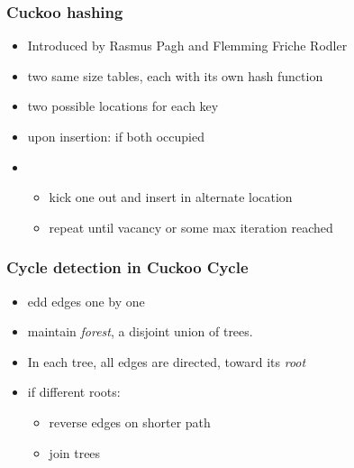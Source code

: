 \documentclass{beamer}
\begin{document}
\begin{frame}
\frametitle{Cuckoo hashing}
\begin{itemize}
\item Introduced by Rasmus Pagh and Flemming Friche Rodler
\pause
\item two same size tables, each with its own hash function
\pause
\item two possible locations for each key
\pause
\item upon insertion: if both occupied
\pause
\item
\begin{itemize}
\item kick one out and insert in alternate location
\pause
\item repeat until vacancy or some max iteration reached
\end{itemize}
\end{itemize}
\end{frame}

\begin{frame}
\frametitle{Cycle detection in Cuckoo Cycle}
\begin{itemize}
\item edd edges one by one
\pause
\item maintain {\em forest}, a disjoint union of trees.
\item In each tree, all edges are directed, toward its {\em root}
\pause
\item if different roots:
\pause
\begin{itemize}
\item reverse edges on shorter path
\pause
\item join trees
\end{itemize}
\end{itemize}
\end{frame}
\end{document}
